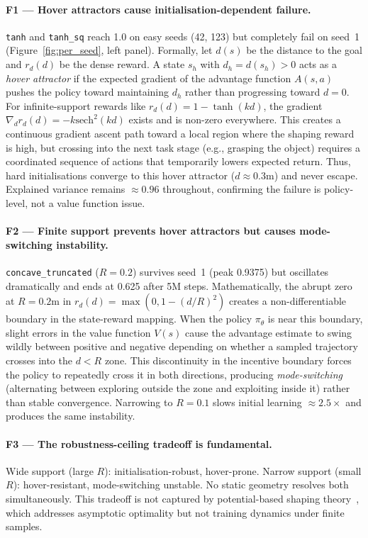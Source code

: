 \documentclass{article}
\begin{document}
\paragraph{F1 — Hover attractors cause initialisation-dependent failure.}
\texttt{tanh} and \texttt{tanh\_sq} reach 1.0 on easy seeds (42, 123) but
completely fail on seed~1 (Figure~\ref{fig:per_seed}, left panel).
Formally, let $d(s)$ be the distance to the goal and $r_d(d)$ be the dense reward. A state $s_h$ with $d_h = d(s_h) > 0$ acts as a \emph{hover attractor} if the expected gradient of the advantage function $A(s,a)$ pushes the policy toward maintaining $d_h$ rather than progressing toward $d=0$.
For infinite-support rewards like $r_d(d) = 1 - \tanh(kd)$, the gradient $\nabla_d r_d(d) = -k\text{sech}^2(kd)$ exists and is non-zero everywhere. This creates a continuous gradient ascent path toward a local region where the shaping reward is high, but crossing into the next task stage (e.g., grasping the object) requires a coordinated sequence of actions that temporarily lowers expected return. Thus, hard initialisations converge to this hover attractor ($d \approx 0.3$m) and never escape.
Explained variance remains $\approx 0.96$ throughout, confirming the failure is
policy-level, not a value function issue.

\paragraph{F2 — Finite support prevents hover attractors but causes mode-switching instability.}
\texttt{concave\_truncated} ($R{=}0.2$) survives seed~1 (peak 0.9375) but
oscillates dramatically and ends at 0.625 after 5M steps.
Mathematically, the abrupt zero at $R = 0.2$m in $r_d(d) = \max(0, 1 - (d/R)^2)$ creates a non-differentiable boundary in the state-reward mapping. When the policy $\pi_\theta$ is near this boundary, slight errors in the value function $V(s)$ cause the advantage estimate to swing wildly between positive and negative depending on whether a sampled trajectory crosses into the $d < R$ zone.
This discontinuity in the incentive boundary forces the policy to repeatedly cross it in both directions, producing \emph{mode-switching} (alternating between exploring outside the zone and exploiting inside it) rather than stable convergence.
Narrowing to $R{=}0.1$ slows initial learning $\approx\!2.5\times$ and produces
the same instability.

\paragraph{F3 — The robustness-ceiling tradeoff is fundamental.}
Wide support (large $R$): initialisation-robust, hover-prone.
Narrow support (small $R$): hover-resistant, mode-switching unstable.
No static geometry resolves both simultaneously.
This tradeoff is not captured by potential-based shaping theory~\citep{ng1999shaping},
which addresses asymptotic optimality but not training dynamics under finite samples.
\end{document}
